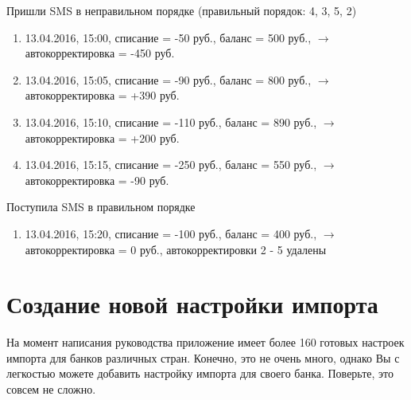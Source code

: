 \documentclass[a4paper,10pt,russian]{sphinxmanual}
\begin{document}
Пришли SMS в неправильном порядке (правильный порядок: 4, 3, 5, 2)
\begin{enumerate}
\def\theenumi{\arabic{enumi}}
\def\labelenumi{\theenumi .}
\makeatletter\def\p@enumii{\p@enumi \theenumi .}\makeatother
\setcounter{enumi}{1}
\item {} 
13.04.2016, 15:00, списание = -50 руб., баланс = 500 руб., \(\rightarrow\) автокорректировка = -450 руб.

\item {} 
13.04.2016, 15:05, списание = -90 руб., баланс = 800 руб., \(\rightarrow\) автокорректировка = +390 руб.

\item {} 
13.04.2016, 15:10, списание = -110 руб., баланс = 890 руб., \(\rightarrow\) автокорректировка = +200 руб.

\item {} 
13.04.2016, 15:15, списание = -250 руб., баланс = 550 руб., \(\rightarrow\) автокорректировка = -90 руб.

\end{enumerate}

Поступила SMS в правильном порядке
\begin{enumerate}
\def\theenumi{\arabic{enumi}}
\def\labelenumi{\theenumi .}
\makeatletter\def\p@enumii{\p@enumi \theenumi .}\makeatother
\setcounter{enumi}{5}
\item {} 
13.04.2016, 15:20, списание = -100 руб., баланс = 400 руб., \(\rightarrow\) автокорректировка = 0 руб., автокорректировки 2 - 5 удалены

\end{enumerate}


\section{Создание новой настройки импорта}
\label{\detokenize{notifications:id2}}
На момент написания руководства приложение имеет более 160 готовых настроек импорта для банков различных стран.
Конечно, это не очень много, однако Вы с легкостью можете добавить настройку импорта для своего банка.
Поверьте, это совсем не сложно.

\noindent{}
\noindent{}
\noindent{}
\end{document}

